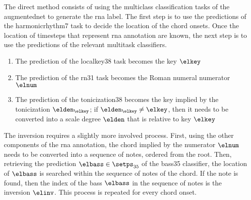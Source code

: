 

The direct method consists of using the multiclass
classification tasks of the \gls{augmentednet} to generate
the \gls{rna} label. The first step is to use the
predictions of the \gls{harmonicrhythm7} task to decide the
location of the chord onsets. Once the location of timesteps
that represent \gls{rna} annotation are known, the next step
is to use the predictions of the relevant multitask
classifiers.

\begin{enumerate}
    \item[] The prediction of the \gls{localkey38} task
    becomes the key $\elkey$
    \item[] The prediction of the \gls{rn31} task becomes
    the Roman numeral numerator $\elnum$
    \item[] The prediction of the \gls{tonicization38}
    becomes the key implied by the tonicization
    $\elden_\elkey$; if $\elden_\elkey \neq \elkey$, then it
    needs to be converted into a scale degree $\elden$ that
    is relative to key $\elkey$ 
\end{enumerate}

The inversion requires a slightly more involved process.
First, using the other components of the \gls{rna}
annotation, the chord implied by the numerator $\elnum$
needs to be converted into a sequence of notes, ordered from
the root. Then, retrieving the prediction $\elbass \in
\setps_{35}$ of the \gls{bass35} classifier, the location of
$\elbass$ is searched within the sequence of notes of the
chord. If the note is found, then the index of the bass
$\elbass$ in the sequence of notes is the inversion
$\elinv$. This process is repeated for every chord onset.




